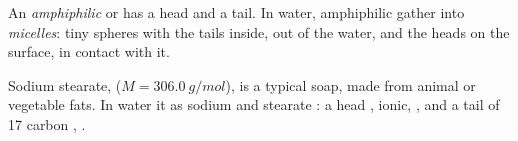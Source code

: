 \begin{definition}\label{def:g11:dissolution:amphiphilic}
An \emph{amphiphilic}  or  has a
 head and a  tail. In water, amphiphilic 
gather into \emph{micelles}: tiny spheres with the tails
inside, out of the water, and the heads on the surface, in contact with
it.
\end{definition}

\begin{example}[A soap]\label{ex:g11:dissolution:soap}
Sodium stearate,  ($M = \qty{306.0}{g/mol}$), is a
typical soap, made from animal or vegetable fats. In water it 
as sodium   and stearate  : a head
, ionic, , and a tail of 17 carbon ,
.
\end{example}

